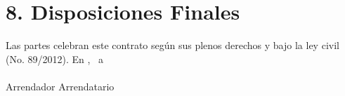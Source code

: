 \section*{8. Disposiciones Finales}
Las partes celebran este contrato según sus plenos derechos y bajo la ley civil (No. 89/2012). 
\vspace{2cm}
En \ContractPlace, \ a \ContractDate \hfill \underline{\hspace{5cm}} \\ \vspace{1.5cm}
\underline{\hspace{5cm}} \hfill \underline{\hspace{5cm}} \\ \vspace{0.2cm} Arrendador \hfill Arrendatario \\
